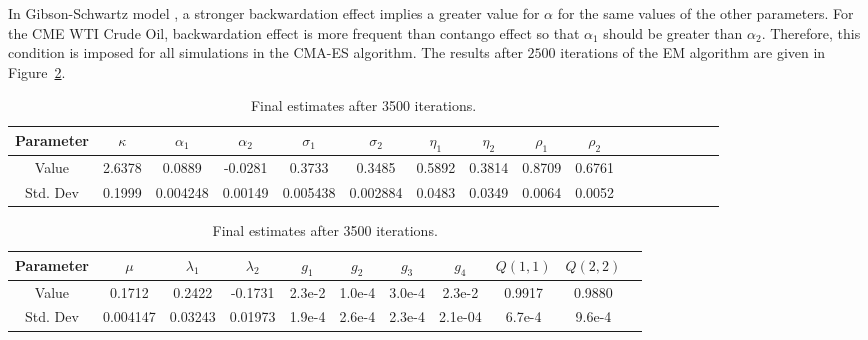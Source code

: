 In Gibson-Schwartz model \cite{gibson:schwartz:1990}, a stronger backwardation effect implies a greater value for $\alpha$ for the same values of the other parameters. For the CME WTI Crude Oil, backwardation effect is more frequent than contango effect so that $\alpha_1$ should be greater than $\alpha_2$. Therefore, this condition is imposed for all simulations in the CMA-ES algorithm. The results after $2500$ iterations of the EM algorithm are given in Figure~\ref{fig:CMEfinalestimates}.
\begin{table}[h!]
	\centering
	\begin{tabular}{||c|c|c|c|c|c|c|c|c|c|c||c|clc|c|c||}
		Parameter&$\kappa$ & $\alpha_1$ & $\alpha_2$ & $\sigma_1$ & $\sigma_2$ & $\eta_1$ & $\eta_2$ & $\rho_1$ & $\rho_2$  \\
		\hline
		Value&2.6378 & 0.0889 & -0.0281 & 0.3733 & 0.3485 & 0.5892 & 0.3814 & 0.8709 & 0.6761   \\
		\hline
		Std. Dev& 0.1999 & 0.004248 & 0.00149 & 0.005438 & 0.002884 & 0.0483 & 0.0349 & 0.0064 & 0.0052   \\
	\end{tabular}
	\vspace{1.cm}
	\begin{tabular}{|c|c|c|c|c|c|c|c|c|c|c|||}
		Parameter&$\mu$ & $\lambda_1$ & $\lambda_2$ & $g_1$ & $g_2$ & $g_3$ & $g_4$  & $Q(1,1)$ & $Q(2,2)$\\
		\hline
		Value&0.1712 & 0.2422	& -0.1731 & 2.3e-2 & 1.0e-4 & 3.0e-4 & 2.3e-2 & 0.9917 & 0.9880 \\
		\hline
		Std. Dev& 0.004147 & 0.03243 & 0.01973 & 1.9e-4 & 2.6e-4 & 2.3e-4 & 2.1e-04 &  6.7e-4 & 9.6e-4
	\end{tabular}
	\caption{Final estimates after 3500 iterations.}
	\label{fig:CMEfinalestimates}
\end{table}


